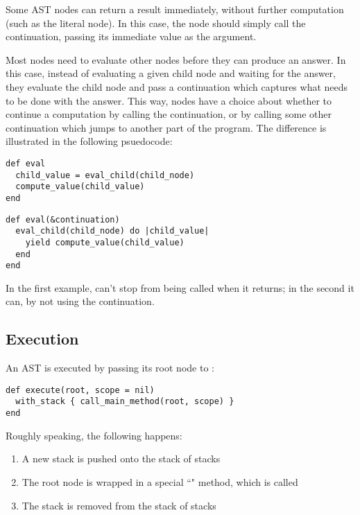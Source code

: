 Some AST nodes can return a result immediately, without further computation (such as the literal  node). In this case, the node should simply call the continuation, passing its immediate value as the argument.

Most nodes need to evaluate other nodes before they can produce an answer. In this case, instead of evaluating a given child node and waiting for the answer, they evaluate the child node and pass a continuation which captures what needs to be done with the answer. This way, nodes have a choice about whether to continue a computation by calling the continuation, or by calling some other continuation which jumps to another part of the program. The difference is illustrated in the following psuedocode:

\begin{lstlisting}[title={\textbf{Without CPS}}]
def eval
  child_value = eval_child(child_node)
  compute_value(child_value)
end
\end{lstlisting}

\begin{lstlisting}[title={\textbf{With CPS}}]
def eval(&continuation)
  eval_child(child_node) do |child_value|
    yield compute_value(child_value)
  end
end
\end{lstlisting}

In the first example,  can't stop  from being called when it returns; in the second it can, by not using the continuation.

\subsection{Execution}

An AST is executed by passing its root node to :

\begin{lstlisting}
def execute(root, scope = nil)
  with_stack { call_main_method(root, scope) }
end
\end{lstlisting}

Roughly speaking, the following happens:

\begin{enumerate}
  \item A new stack is pushed onto the stack of stacks
  \item The root node is wrapped in a special ``" method, which is called
  \item The stack is removed from the stack of stacks
\end{enumerate}

